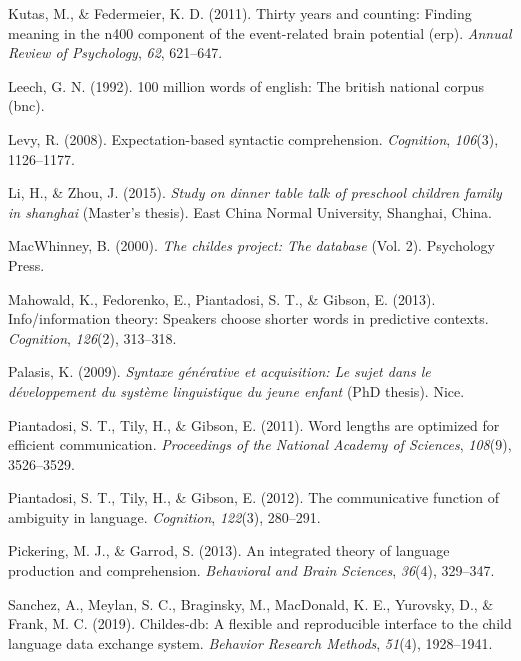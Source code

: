 \documentclass[man,floatsintext]{apa6}
\begin{document}
\leavevmode\hypertarget{ref-kutas2011}{}%
Kutas, M., \& Federmeier, K. D. (2011). Thirty years and counting: Finding meaning in the n400 component of the event-related brain potential (erp). \emph{Annual Review of Psychology}, \emph{62}, 621--647.

\leavevmode\hypertarget{ref-leech1992}{}%
Leech, G. N. (1992). 100 million words of english: The british national corpus (bnc).

\leavevmode\hypertarget{ref-levy2008}{}%
Levy, R. (2008). Expectation-based syntactic comprehension. \emph{Cognition}, \emph{106}(3), 1126--1177.

\leavevmode\hypertarget{ref-li2015}{}%
Li, H., \& Zhou, J. (2015). \emph{Study on dinner table talk of preschool children family in shanghai} (Master's thesis). East China Normal University, Shanghai, China.

\leavevmode\hypertarget{ref-macwhinney2000}{}%
MacWhinney, B. (2000). \emph{The childes project: The database} (Vol. 2). Psychology Press.

\leavevmode\hypertarget{ref-mahowald2013}{}%
Mahowald, K., Fedorenko, E., Piantadosi, S. T., \& Gibson, E. (2013). Info/information theory: Speakers choose shorter words in predictive contexts. \emph{Cognition}, \emph{126}(2), 313--318.

\leavevmode\hypertarget{ref-palasis2009}{}%
Palasis, K. (2009). \emph{Syntaxe générative et acquisition: Le sujet dans le développement du système linguistique du jeune enfant} (PhD thesis). Nice.

\leavevmode\hypertarget{ref-piantadosi2011}{}%
Piantadosi, S. T., Tily, H., \& Gibson, E. (2011). Word lengths are optimized for efficient communication. \emph{Proceedings of the National Academy of Sciences}, \emph{108}(9), 3526--3529.

\leavevmode\hypertarget{ref-piantadosi2012}{}%
Piantadosi, S. T., Tily, H., \& Gibson, E. (2012). The communicative function of ambiguity in language. \emph{Cognition}, \emph{122}(3), 280--291.

\leavevmode\hypertarget{ref-pickering2013}{}%
Pickering, M. J., \& Garrod, S. (2013). An integrated theory of language production and comprehension. \emph{Behavioral and Brain Sciences}, \emph{36}(4), 329--347.

\leavevmode\hypertarget{ref-sanchez2019}{}%
Sanchez, A., Meylan, S. C., Braginsky, M., MacDonald, K. E., Yurovsky, D., \& Frank, M. C. (2019). Childes-db: A flexible and reproducible interface to the child language data exchange system. \emph{Behavior Research Methods}, \emph{51}(4), 1928--1941.
\end{document}
